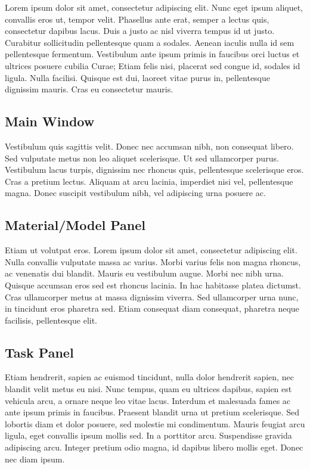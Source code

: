 Lorem ipsum dolor sit amet, consectetur adipiscing elit. Nunc eget ipsum aliquet, convallis eros ut, tempor velit. Phasellus ante erat, semper a lectus quis, consectetur dapibus lacus. Duis a justo ac nisl viverra tempus id ut justo. Curabitur sollicitudin pellentesque quam a sodales. Aenean iaculis nulla id sem pellentesque fermentum. Vestibulum ante ipsum primis in faucibus orci luctus et ultrices posuere cubilia Curae; Etiam felis nisi, placerat sed congue id, sodales id ligula. Nulla facilisi. Quisque est dui, laoreet vitae purus in, pellentesque dignissim mauris. Cras eu consectetur mauris.

\subsection{Main Window}
Vestibulum quis sagittis velit. Donec nec accumsan nibh, non consequat libero. Sed vulputate metus non leo aliquet scelerisque. Ut sed ullamcorper purus. Vestibulum lacus turpis, dignissim nec rhoncus quis, pellentesque scelerisque eros. Cras a pretium lectus. Aliquam at arcu lacinia, imperdiet nisi vel, pellentesque magna. Donec suscipit vestibulum nibh, vel adipiscing urna posuere ac.

\subsection{Material/Model Panel}
Etiam ut volutpat eros. Lorem ipsum dolor sit amet, consectetur adipiscing elit. Nulla convallis vulputate massa ac varius. Morbi varius felis non magna rhoncus, ac venenatis dui blandit. Mauris eu vestibulum augue. Morbi nec nibh urna. Quisque accumsan eros sed est rhoncus lacinia. In hac habitasse platea dictumst. Cras ullamcorper metus at massa dignissim viverra. Sed ullamcorper urna nunc, in tincidunt eros pharetra sed. Etiam consequat diam consequat, pharetra neque facilisis, pellentesque elit.

\subsection{Task Panel}
Etiam hendrerit, sapien ac euismod tincidunt, nulla dolor hendrerit sapien, nec blandit velit metus eu nisi. Nunc tempus, quam eu ultrices dapibus, sapien est vehicula arcu, a ornare neque leo vitae lacus. Interdum et malesuada fames ac ante ipsum primis in faucibus. Praesent blandit urna ut pretium scelerisque. Sed lobortis diam et dolor posuere, sed molestie mi condimentum. Mauris feugiat arcu ligula, eget convallis ipsum mollis sed. In a porttitor arcu. Suspendisse gravida adipiscing arcu. Integer pretium odio magna, id dapibus libero mollis eget. Donec nec diam ipsum.

